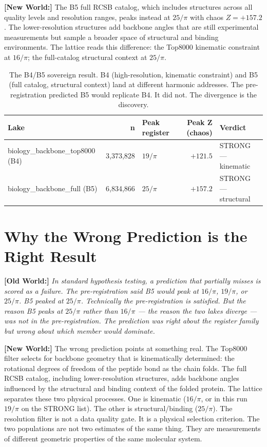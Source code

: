 \documentclass[11pt, letterpaper, openany]{book}
\newcommand{\oldworld}[1]{\noindent\textbf{\color{goldseal}[Old World:]} \textit{#1}\medskip}
\newcommand{\newworld}[1]{\noindent\textbf{\color{kishblue}[New World:]} #1\medskip}
\begin{document}
\begin{empiricalbox}
\newworld{The B5 full RCSB catalog, which includes structures across all
quality levels and resolution ranges, peaks instead at $25/\pi$ with
chaos $Z = +157.2$. The lower-resolution structures add backbone angles that
are still experimental measurements but sample a broader space of structural
and binding environments. The lattice reads this difference: the Top8000
kinematic constraint at $16/\pi$; the full-catalog structural context at $25/\pi$.}

\begin{table}[H]
\centering
\renewcommand{\arraystretch}{1.5}
\small
\begin{tabular}{|l|r|l|r|l|}
\hline
\rowcolor{kishblue!10}
\textbf{Lake} & \textbf{n} & \textbf{Peak register} & \textbf{Peak Z (chaos)} & \textbf{Verdict} \\
\hline\hline
\rowcolor{backbonegreen!10}
biology\_backbone\_top8000 (B4) & 3,373,828 & $19/\pi$ & $+121.5$ & STRONG --- kinematic \\
\rowcolor{backbonegreen!6}
biology\_backbone\_full (B5)    & 6,834,866 & $25/\pi$ & $+157.2$ & STRONG --- structural \\
\hline
\end{tabular}
\caption{The B4/B5 sovereign result. B4 (high-resolution, kinematic constraint)
and B5 (full catalog, structural context) land at different harmonic addresses.
The pre-registration predicted B5 would replicate B4. It did not. The
divergence is the discovery.}
\label{tab:b4b5_split}
\end{table}

\section{Why the Wrong Prediction is the Right Result}

\oldworld{In standard hypothesis testing, a prediction that partially misses
is scored as a failure. The pre-registration said B5 would peak at $16/\pi$,
$19/\pi$, or $25/\pi$. B5 peaked at $25/\pi$. Technically the pre-registration
is satisfied. But the reason B5 peaks at $25/\pi$ rather than $16/\pi$ ---
the reason the two lakes diverge --- was not in the pre-registration. The
prediction was right about the register family but wrong about which
member would dominate.}

\newworld{The wrong prediction points at something real. The Top8000 filter
selects for backbone geometry that is kinematically determined: the rotational
degrees of freedom of the peptide bond as the chain folds. The full RCSB
catalog, including lower-resolution structures, adds backbone angles influenced
by the structural and binding context of the folded protein. The lattice
separates these two physical processes. One is kinematic ($16/\pi$, or in
this run $19/\pi$ on the STRONG list). The other is structural/binding
($25/\pi$). The resolution filter is not a data quality gate. It is a physical
selection criterion. The two populations are not two estimates of the same thing.
They are measurements of different geometric properties of the same molecular
system.}


\end{empiricalbox}
\end{document}
